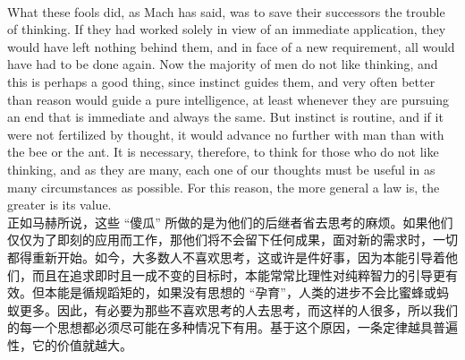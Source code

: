 \documentclass{article}
\begin{document}
\\
What these fools did, as Mach has said, was to save their successors the trouble of thinking. If they had worked solely in view of an immediate application, they would have left nothing behind them, and in face of a new requirement, all would have had to be done again. Now the majority of men do not like thinking, and this is perhaps a good thing, since instinct guides them, and very often better than reason would guide a pure intelligence, at least whenever they are pursuing an end that is immediate and always the same. But instinct is routine, and if it were not fertilized by thought, it would advance no further with man than with the bee or the ant. It is necessary, therefore, to think for those who do not like thinking, and as they are many, each one of our thoughts must be useful in as many circumstances as possible. For this reason, the more general a law is, the greater is its value.\\
正如马赫所说，这些 “傻瓜” 所做的是为他们的后继者省去思考的麻烦。如果他们仅仅为了即刻的应用而工作，那他们将不会留下任何成果，面对新的需求时，一切都得重新开始。如今，大多数人不喜欢思考，这或许是件好事，因为本能引导着他们，而且在追求即时且一成不变的目标时，本能常常比理性对纯粹智力的引导更有效。但本能是循规蹈矩的，如果没有思想的 “孕育”，人类的进步不会比蜜蜂或蚂蚁更多。因此，有必要为那些不喜欢思考的人去思考，而这样的人很多，所以我们的每一个思想都必须尽可能在多种情况下有用。基于这个原因，一条定律越具普遍性，它的价值就越大。 \\
\end{document}
